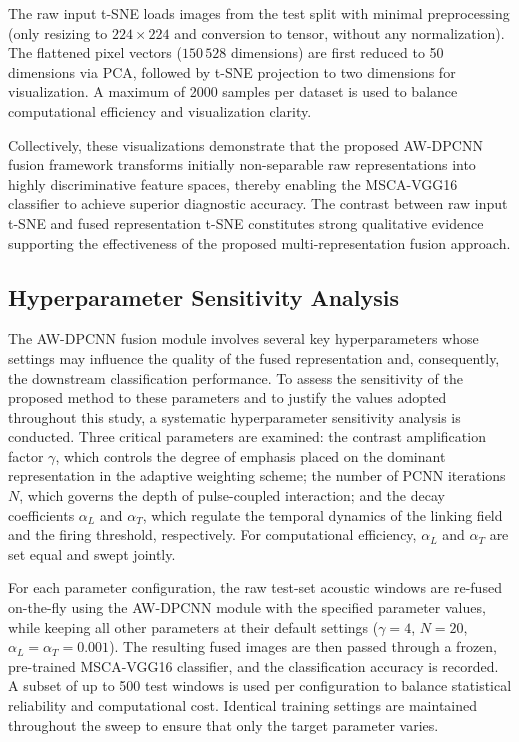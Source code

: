 \documentclass[journal]{IEEEtran}
\begin{document}
The raw input t-SNE loads images from the test split with minimal preprocessing (only resizing to $224\times224$ and conversion to tensor, without any normalization). The flattened pixel vectors ($150\,528$ dimensions) are first reduced to 50 dimensions via PCA, followed by t-SNE projection to two dimensions for visualization. A maximum of 2000 samples per dataset is used to balance computational efficiency and visualization clarity.

Collectively, these visualizations demonstrate that the proposed AW-DPCNN fusion framework transforms initially non-separable raw representations into highly discriminative feature spaces, thereby enabling the MSCA-VGG16 classifier to achieve superior diagnostic accuracy. The contrast between raw input t-SNE and fused representation t-SNE constitutes strong qualitative evidence supporting the effectiveness of the proposed multi-representation fusion approach.

\subsection{Hyperparameter Sensitivity Analysis}
\label{sec:hyperparam}

The AW-DPCNN fusion module involves several key hyperparameters whose settings may influence the quality of the fused representation and, consequently, the downstream classification performance. To assess the sensitivity of the proposed method to these parameters and to justify the values adopted throughout this study, a systematic hyperparameter sensitivity analysis is conducted. Three critical parameters are examined: the contrast amplification factor $\gamma$, which controls the degree of emphasis placed on the dominant representation in the adaptive weighting scheme; the number of PCNN iterations $N$, which governs the depth of pulse-coupled interaction; and the decay coefficients $\alpha_L$ and $\alpha_T$, which regulate the temporal dynamics of the linking field and the firing threshold, respectively. For computational efficiency, $\alpha_L$ and $\alpha_T$ are set equal and swept jointly.

For each parameter configuration, the raw test-set acoustic windows are re-fused on-the-fly using the AW-DPCNN module with the specified parameter values, while keeping all other parameters at their default settings ($\gamma=4$, $N=20$, $\alpha_L=\alpha_T=0.001$). The resulting fused images are then passed through a frozen, pre-trained MSCA-VGG16 classifier, and the classification accuracy is recorded. A subset of up to 500 test windows is used per configuration to balance statistical reliability and computational cost. Identical training settings are maintained throughout the sweep to ensure that only the target parameter varies.
\end{document}
